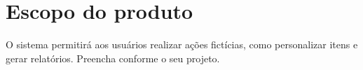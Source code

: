 \section{Escopo do produto}

O sistema permitirá aos usuários realizar ações fictícias, como personalizar itens e gerar relatórios. Preencha conforme o seu projeto.
